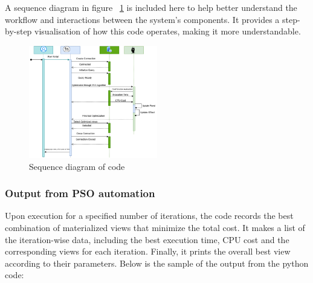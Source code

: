
\vspace{.4cm}

A sequence diagram in figure ~\ref{fig:Sequence_diagram} is included here to help better understand the workflow and interactions between the system's components. It provides a step-by-step visualisation of how this code operates, making it more understandable.
  


\clearpage




\begin{figure}[h]
    \centering
    \includegraphics[width=0.5\textwidth]{Figure/seq.diagram .png} %
    \caption{Sequence diagram of code}
    \label{fig:Sequence_diagram}
\end{figure}






\subsubsection{Output from PSO automation }  Upon execution for a specified number of iterations, the code records the best combination of materialized views that minimize the total cost. It makes a list of the iteration-wise data, including the best execution time, CPU cost and the corresponding views for each iteration. Finally, it prints the overall best view according to their parameters. Below is the sample of the output from the python code: \vspace{.4cm}




